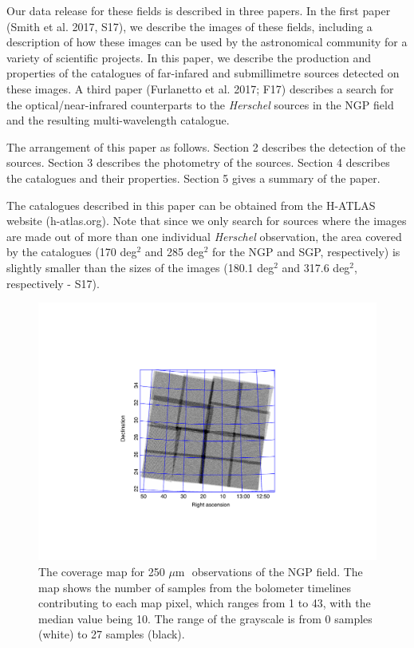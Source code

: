 \documentclass[useAMS,usenatbib]{mnras}
\def\mic{ $\mu $m\,}
\begin{document}
Our data release for these fields is
described in three papers. In the first paper (Smith et al. 2017, S17), we describe
the images of these fields, including a description of how these
images can be used by the astronomical community for a variety of scientific
projects.
In this paper, we describe the production and
properties of the catalogues of 
far-infared and submillimetre sources detected on these images. A third paper
(Furlanetto et al. 2017; F17) describes a search for the optical/near-infrared counterparts
to the {\it Herschel} sources in the NGP field and the resulting multi-wavelength catalogue.

The arrangement of this paper as follows. Section 2 
describes the
detection of the sources. Section 3 describes the 
photometry of the sources. Section 4 describes the catalogues
and their properties.
Section 5 gives a summary of the paper.

The catalogues described in this paper can be obtained from the 
H-ATLAS website (h-atlas.org).
Note that since we only search for sources where the images
are made out of more than one individual {\it Herschel} observation,
the area covered by the catalogues (170 deg$^2$ and 285 deg$^2$ for the
NGP and SGP, respectively) is slightly smaller than the
sizes of the images (180.1 deg$^2$ and 317.6 deg$^2$, respectively - S17).

\begin{figure} %
\includegraphics[scale=0.9]{ngpcoverage.pdf}
\caption{\protect\label{skymapn} The coverage map for 250\mic\ observations
of the NGP field.
The map shows the number of samples from the bolometer timelines contributing
to each map pixel, which ranges from 1 to 43, with the median value being 10.
The range of the grayscale is from 0 samples (white) to 27 samples
(black).}

\end{figure}
\end{document}
